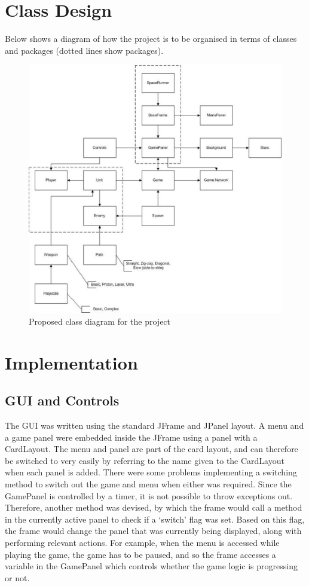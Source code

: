 \section{Class Design}
\label{sec: class_design}
Below shows a diagram of how the project is to be organised in terms of classes and packages (dotted lines show packages).
\begin{figure}
 \centering
 \includegraphics{class_diagram.eps}
 \caption{Proposed class diagram for the project}
 \label{fig: class_diagram}
\end{figure}

\section{Implementation}
\subsection{GUI and Controls}
The GUI was written using the standard JFrame and JPanel layout. A menu and a game panel were embedded inside the JFrame using a panel with a CardLayout. The menu and panel are part of the card layout, and can therefore be switched to very easily by referring to the name given to the CardLayout when each panel is added. There were some problems implementing a switching method to switch out the game and menu when either was required. Since the GamePanel is controlled by a timer, it is not possible to throw exceptions out. Therefore, another method was devised, by which the frame would call a method in the currently active panel to check if a `switch' flag was set. Based on this flag, the frame would change the panel that was currently being displayed, along with performing relevant actions. For example, when the menu is accessed while playing the game, the game has to be paused, and so the frame accesses a variable in the GamePanel which controls whether the game logic is progressing or not.
